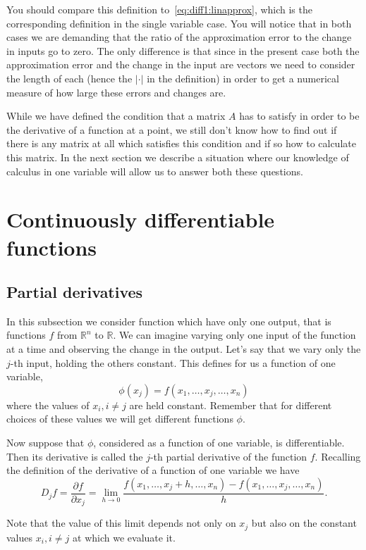 \documentclass[11pt,reqno,openany]{amsbook}
\numberwithin{figure}{chapter}
\numberwithin{equation}{chapter}
\theoremstyle{plain}
\theoremstyle{definition}
\renewcommand{\Re}{\mathbb{R}}
\begin{document}
You should compare this definition
to~\eqref{eq:diff1:linapprox}, which is the corresponding
definition in the single variable case. You will notice that
in both cases we are demanding that the ratio of the
approximation error to the change in inputs go to zero. The
only difference is that since in the present case both the
approximation error and the change in the input are vectors
we need to consider the length of each (hence the $\lvert
\cdot \rvert$ in the definition) in order to get a
numerical measure of how large these errors and changes are.

While we have defined the condition that a matrix $A$ has
to satisfy in order to be the derivative of a function at a
point, we still don't know how to find out if there is any
matrix at all which satisfies this condition and if so how
to calculate this matrix. In the next section we describe a
situation where our knowledge of calculus in one variable
will allow us to answer both these questions.

\section{Continuously differentiable functions}
\subsection{Partial derivatives}
In this subsection we consider function which have only one
output, that is functions $f$ from $\Re^n$ to $\Re$. We can
imagine varying only one input of the function at a time and
observing the change in the output. Let's say that we vary
only the $j$-th input, holding the others constant. This
defines for us a function of one variable,
\[\phi(x_j) = f(x_1,\ldots,x_j,\ldots, x_n)\]
where the values of $x_i, i\ne j$ are held constant.
Remember that for different choices of these values we will
get different functions $\phi$.

Now suppose that $\phi$, considered as a function of one
variable, is differentiable. Then its derivative is called
the $j$-th partial derivative of the function $f$. Recalling
the definition of the derivative of a function of one
variable we have
\[D_j f = \frac{\partial f}{\partial x_j}
=\lim_{h \to 0} 
\frac{f(x_1,\ldots, x_j+h,\ldots, x_n) 
-f(x_1,\ldots,x_j,\ldots,x_n)}
{h}.
\]

Note that the value of this limit depends not only on $x_j$
but also on the constant values $x_i, i\ne j$ at which we
evaluate it.
\end{document}
